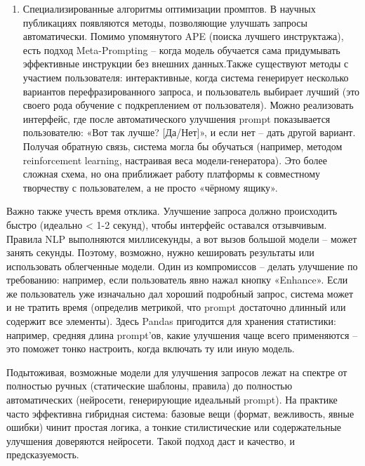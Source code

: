 \begin{enumerate}[label=\arabic*]
\item Специализированные алгоритмы оптимизации промптов. В научных публикациях появляются методы, позволяющие улучшать запросы автоматически. Помимо упомянутого APE (поиска лучшего инструктажа), есть подход Meta-Prompting – когда модель обучается сама придумывать эффективные инструкции без внешних данных.Также существуют методы с участием пользователя: интерактивные, когда система генерирует несколько вариантов перефразированного запроса, и пользователь выбирает лучший (это своего рода обучение с подкреплением от пользователя). Можно реализовать интерфейс, где после автоматического улучшения prompt показывается пользователю: «Вот так лучше? [Да/Нет]», и если нет – дать другой вариант. Получая обратную связь, система могла бы обучаться (например, методом reinforcement learning, настраивая веса модели-генератора). Это более сложная схема, но она приближает работу платформы к совместному творчеству с пользователем, а не просто «чёрному ящику».

\end{enumerate}

Важно также учесть время отклика. Улучшение запроса должно происходить быстро (идеально < 1-2 секунд), чтобы интерфейс оставался отзывчивым. Правила NLP выполняются миллисекунды, а вот вызов большой модели – может занять секунды. Поэтому, возможно, нужно кешировать результаты или использовать облегченные модели. Один из компромиссов – делать улучшение по требованию: например, если пользователь явно нажал кнопку «Enhance». Если же пользователь уже изначально дал хороший подробный запрос, система может и не тратить время (определив метрикой, что prompt достаточно длинный или содержит все элементы). Здесь Pandas пригодится для хранения статистики: например, средняя длина prompt’ов, какие улучшения чаще всего применяются – это поможет тонко настроить, когда включать ту или иную модель.

Подытоживая, возможные модели для улучшения запросов лежат на спектре от полностью ручных (статические шаблоны, правила) до полностью автоматических (нейросети, генерирующие идеальный prompt). На практике часто эффективна гибридная система: базовые вещи (формат, вежливость, явные ошибки) чинит простая логика, а тонкие стилистические или содержательные улучшения доверяются нейросети. Такой подход даст и качество, и предсказуемость.


